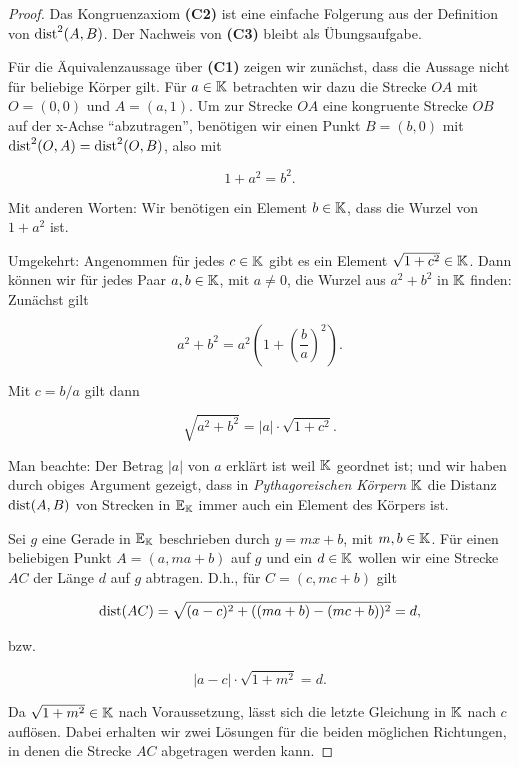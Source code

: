 \begin{proof}
    Das Kongruenzaxiom {\bf (C2)} ist eine einfache Folgerung aus der Definition von $\operatorname{dist}^2(A,B)$.
    Der Nachweis von {\bf (C3)} bleibt als Übungsaufgabe.


    Für die Äquivalenzaussage über {\bf (C1)} zeigen wir zunächst, dass die Aussage nicht für
    beliebige Körper gilt. Für $a\in \mathbb K$ betrachten wir dazu die Strecke $OA$ mit $O = (0,0)$ und $A
    = (a,1)$. Um zur Strecke $OA$ eine kongruente Strecke $OB$ auf der x-Achse "`abzutragen"',
    benötigen wir einen Punkt $B = (b,0)$ mit $\operatorname{dist}^2(O,A) = \operatorname{dist}^2(O,B)$, also mit

    $$
        1 + a^2 = b^2.
    $$

    Mit anderen Worten: Wir benötigen ein Element $b \in \mathbb K$, dass die Wurzel von $1 + a^2$ ist.

    Umgekehrt: Angenommen für jedes $c\in \mathbb K$ gibt es ein Element $\sqrt{1 + c^2} \in \mathbb K$. Dann
    können wir für jedes Paar $a, b \in \mathbb K$, mit $a \not = 0$, die Wurzel aus $a^2 + b^2$ in $\mathbb K$
    finden: Zunächst gilt

    $$
        a^2+b^2 = a^2 \left(1+ \left(\frac{b}{a}\right)^2 \right).
    $$

    Mit $c = b/a$ gilt dann

    $$
        \sqrt{a^2 + b^2} = |a| \cdot \sqrt{1 + c^2}.
    $$

    Man beachte: Der Betrag $|a|$ von $a$ erklärt ist weil $\mathbb K$ geordnet ist; und wir haben durch
    obiges Argument gezeigt, dass in {\em Pythagoreischen Körpern} $\mathbb K$ die Distanz $\operatorname{dist}(A,B)$ von
    Strecken in $\mathbb E_{\mathbb K}$ immer auch ein Element des Körpers ist.

    Sei $g$ eine Gerade in $\mathbb E_{\mathbb K}$ beschrieben durch $y = m x + b$, mit $m, b \in \mathbb K$. Für einen
    beliebigen Punkt $A = (a, m a + b)$ auf $g$ und ein $d \in \mathbb K$ wollen wir eine Strecke $AC$ der
    Länge $d$ auf $g$ abtragen. D.h., für $C = (c, m c + b)$ gilt

    $$
        \operatorname{dist}(AC) = \sqrt{(a - c)^2 + ( (m a + b) - (m c + b) )^2} = d,
    $$

    bzw.

    $$
        |a-c| \cdot \sqrt{1 + m^2} = d.
    $$

    Da $\sqrt{1 + m^2} \in \mathbb K$ nach Voraussetzung, lässt sich die letzte Gleichung in $\mathbb K$ nach $c$
    auflösen. Dabei erhalten wir zwei Lösungen für die beiden möglichen Richtungen, in denen die
    Strecke $AC$ abgetragen werden kann.
\end{proof}

